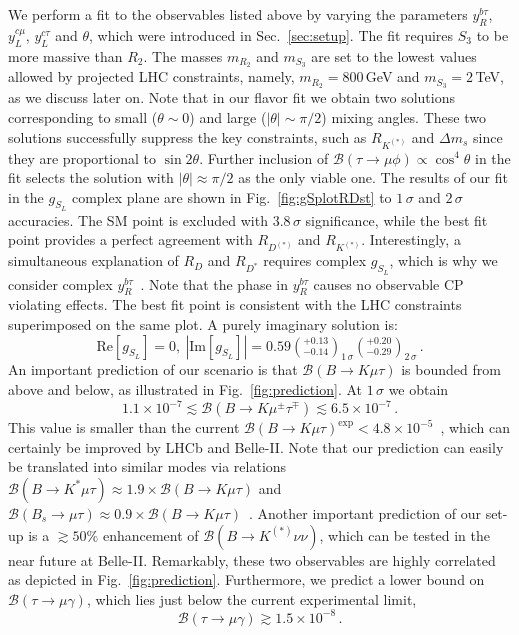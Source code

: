 \documentclass[aps,prd,superscriptaddress,twocolumn,secnumarabic]{revtex4-1}
\newcommand{\E}[1]{\times 10^{#1}}
\begin{document}
We perform a fit to the observables listed above by varying the parameters $y_R^{b\tau}$, $y_L^{c\mu}$, $y_L^{c\tau}$ and $\theta$, which were introduced in Sec.~\ref{sec:setup}. The fit requires $S_3$ to be more massive than $R_2$. The masses $m_{R_2}$ and $m_{S_3}$ are set to the lowest values allowed by projected LHC constraints, namely, $m_{R_2} = 800$\,GeV and $m_{S_3} = 2$\,TeV, as we discuss later on. Note that in our flavor fit we obtain two solutions corresponding to small ($\theta \sim 0$) and large ($|\theta| \sim \pi/2$) mixing angles. These two solutions successfully suppress the key constraints, such as $R_{K^{(*)}}$ and $\Delta m_s$ since they are proportional to $\sin 2\theta$.  Further inclusion of $\mathcal{B}(\tau\to\mu\phi)\propto \cos^4\theta$ in the fit selects the solution with $|\theta| \approx \pi/2$ as the only viable one. The results of our fit in the $g_{S_L}$ complex plane are shown in Fig.~\ref{fig:gSplotRDst} to $1\,\sigma$ and $2\,\sigma$ accuracies. The SM point is excluded with $3.8\,\sigma$ significance, while the best fit point provides a perfect agreement with $R_{D^{(\ast)}}$ and $R_{K^{(\ast)}}$. Interestingly, a simultaneous explanation of $R_D$ and $R_{D^\ast}$ requires complex $g_{S_L}$, which is why we consider complex $y_R^{b\tau}$~\cite{Sakaki:2014sea,Becirevic:2018uab}. Note that the phase in $y_R^{b\tau}$ causes no observable CP violating effects. The best fit point is consistent with the LHC constraints superimposed on the same plot. A purely imaginary solution is:
\begin{equation}
\label{eq:Nejc}
  \mathrm{Re} [g_{S_L}] = 0,~
  |\mathrm{Im} [g_{S_L}]| = 0.59
     \left(^{+0.13}_{-0.14}\right)_{1\,\sigma} \left(^{+0.20}_{-0.29}\right)_{2\,\sigma}\,.
\end{equation}
\noindent An important prediction of our scenario is that $\mathcal{B}(B\to K\mu\tau)$ is bounded from above and below, as illustrated in Fig.~\ref{fig:prediction}. At $1\,\sigma$ we obtain
\begin{equation}
1.1 \times 10^{-7}\lesssim  \mathcal{B}( B\to K \mu^\pm \tau^\mp) \lesssim 6.5\times 10^{-7} \,.
\end{equation}
This value is smaller than the current $\mathcal{B}(B\to K \mu \tau)^{\mathrm{exp}}<4.8\times 10^{-5}$~\cite{Lees:2012zz}, which can certainly be improved by LHCb and Belle-II. Note that our prediction can easily be translated into similar modes via relations $\mathcal{B}(B\to K^\ast \mu\tau)\approx 1.9\times \mathcal{B}(B\to K \mu \tau)$ and $\mathcal{B}(B_s\to \mu\tau)\approx  0.9 \times \mathcal{B}(B\to K \mu \tau)$~\cite{Becirevic:2016zri,Glashow:2014iga,Guadagnoli:2015nra}. Another important prediction of our set-up is a $\gtrsim 50\%$ enhancement of $\mathcal{B}(B\to K ^{(\ast)} \nu \nu)$, which can be tested in the near future at Belle-II. Remarkably, these two observables are highly correlated as depicted in Fig.~\ref{fig:prediction}. Furthermore, we predict a lower bound on $\mathcal{B}(\tau \to \mu \gamma)$, which lies just below the current experimental limit,
\begin{equation}
 \mathcal{B}(\tau \to \mu \gamma) \gtrsim 1.5\E{-8}\,.
\end{equation}
\end{document}
